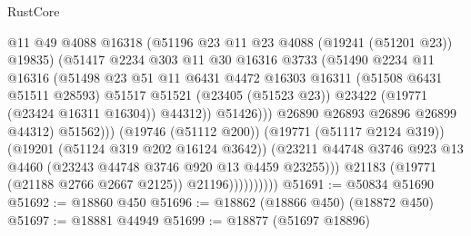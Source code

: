 \begin{lexlean}{RustCore}
\begin{coremodule}
                                      @11
                                      @49
                                      @4088
                                      @16318
                                      (@51196 @23 @11 @23 @4088 (@19241 (@51201 @23)) @19835)
                                      (@51417
                                        @2234
                                        @303
                                        @11
                                        @30
                                        @16316
                                        @3733
                                        (@51490
                                          @2234
                                          @11
                                          @16316
                                          (@51498
                                            @23
                                            @51
                                            @11
                                            @6431
                                            @4472
                                            @16303
                                            @16311
                                            (@51508 @6431 @51511 @28593)
                                            @51517
                                            @51521
                                            (@23405 (@51523 @23))
                                            @23422
                                            (@19771 (@23424 @16311 @16304))
                                            @44312))
                                        @51426)))
                                  @26890
                                  @26893
                                  @26896
                                  @26899
                                  @44312)
                                @51562)))
                          (@19746 (@51112 @200))
                          (@19771 (@51117 @2124 @319))
                          (@19201 (@51124 @319 @202 @16124 @3642))
                          (@23211
                            @44748
                            @3746
                            @923
                            @13
                            @4460
                            (@23243 @44748 @3746 @920 @13 @4459 @23255)))
                        @21183
                        (@19771 (@21188 @2766 @2667 @2125))
                        @21196))))))))))
@51691 := @50834 @51690
@51692 := @18860 @450
@51696 := @18862 (@18866 @450) (@18872 @450)
@51697 := @18881 @44949
@51699 := @18877 (@51697 @18896)

\end{coremodule}
\end{lexlean}
